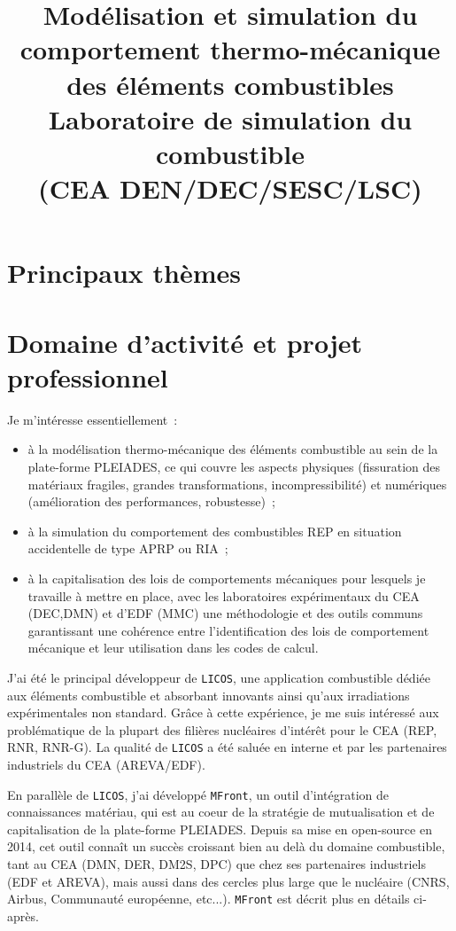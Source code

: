 \documentclass[11pt,a4paper]{moderncv}
\title{ Modélisation et simulation du comportement thermo-mécanique
  des éléments combustibles\\ Laboratoire de simulation du combustible\\
  (CEA DEN/DEC/SESC/LSC) }
\makeatletter
\newcommand\contentsname{Contents}
\newcommand\tableofcontents{%
\addtocontents{toc}{\protect\setcounter{tocdepth}{0}}
\section*{\contentsname}
\addtocontents{toc}{\protect\setcounter{tocdepth}{2}}
    \@starttoc{toc}%
    }
\renewcommand{\contentsname}{Principaux thèmes}
\makeatother
\begin{document}
\maketitle

\setcounter{tocdepth}{0}
\tableofcontents{}

\section{Domaine d'activité et projet professionnel}

Je m'intéresse essentiellement~:
\begin{itemize}
\item à la modélisation thermo-mécanique des éléments combustible au
  sein de la plate-forme PLEIADES, ce qui couvre les aspects physiques
  (fissuration des matériaux fragiles, grandes transformations,
  incompressibilité) et numériques (amélioration des performances,
  robustesse)~;
\item à la simulation du comportement des combustibles REP en
  situation accidentelle de type APRP ou RIA~;
\item à la capitalisation des lois de comportements mécaniques pour
  lesquels je travaille à mettre en place, avec les laboratoires
  expérimentaux du CEA (DEC,DMN) et d'EDF (MMC) une méthodologie et
  des outils communs garantissant une cohérence entre l'identification
  des lois de comportement mécanique et leur utilisation dans les
  codes de calcul.
\end{itemize}

J'ai été le principal développeur de \texttt{LICOS}, une application
combustible dédiée aux éléments combustible et absorbant innovants
ainsi qu'aux irradiations expérimentales non standard. Grâce à cette
expérience, je me suis intéressé aux problématique de la plupart des
filières nucléaires d'intérêt pour le CEA (REP, RNR, RNR-G). La
qualité de \texttt{LICOS} a été saluée en interne et par les
partenaires industriels du CEA (AREVA/EDF).

En parallèle de \texttt{LICOS}, j'ai développé \texttt{MFront}, un
outil d'intégration de connaissances matériau, qui est au coeur de la
stratégie de mutualisation et de capitalisation de la plate-forme
PLEIADES. Depuis sa mise en open-source en 2014, cet outil connaît un
succès croissant bien au delà du domaine combustible, tant au CEA
(DMN, DER, DM2S, DPC) que chez ses partenaires industriels (EDF et
AREVA), mais aussi dans des cercles plus large que le nucléaire (CNRS,
Airbus, Communauté européenne, etc...). \texttt{MFront} est décrit
plus en détails ci-après.
\end{document}

